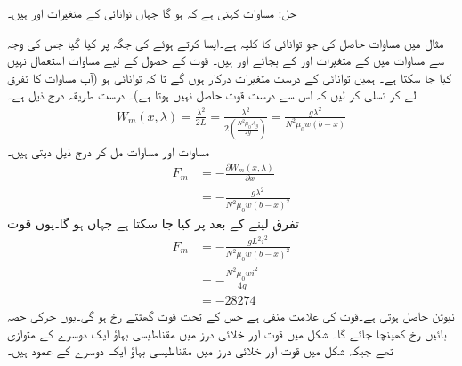 حل:\quad
مساوات   کہتی ہے کہ  ہو گا جہاں توانائی کے متغیرات   اور  ہیں۔

مثال  میں  مساوات  حاصل کی جو توانائی کا کلیہ ہے۔ایسا کرتے ہوئے    کی  جگہ   پر کیا گیا جس کی وجہ سے  مساوات  میں   کے متغیرات  اور  کے بجائے    اور  ہیں۔  قوت کے حصول کے لیے  مساوات  استعمال نہیں کیا جا سکتا ہے۔ ہمیں  توانائی کے درست متغیرات درکار ہوں گے تا کہ توانائی  ہو (آپ مساوات  کا تفرق لے کر تسلی کر لیں کہ اس سے درست قوت حاصل نہیں ہوتا ہے)۔ درست طریقہ درج ذیل ہے۔
\begin{align}\label{مساوات_تبادلہ_درست_متغیرات}
W_m(x,\lambda)=\frac{\lambda^2}{2 L}=\frac{\lambda^2}{2 \left(\frac{N^2 \mu_0 A_g}{2 g} \right)}=\frac{ g \lambda^2}{N^2 \mu_0 w (b-x)}
\end{align}
مساوات  اور مساوات  مل کر درج ذیل دیتی ہیں۔
\begin{align*}
F_m&=-\frac{\partial W_m(x,\lambda)}{\partial x}\\
&=-\frac{g \lambda^2}{N^2 \mu_0 w (b-x)^2}
\end{align*}
تفرق لینے کے بعد  پر کیا جا سکتا ہے جہاں   ہو گا۔یوں قوت
\begin{align*}
F_m&=-\frac{g L^2 i^2}{N^2 \mu_0 w (b-x)^2}\\
&=-\frac{N^2 \mu_0 w i^2}{4 g}\\
&=\num{-28274}
\end{align*}
نیوٹن حاصل ہوتی ہے۔قوت کی علامت منفی ہے جس کے تحت قوت   گھٹتے  رخ ہو گی۔یوں حرکی حصہ بائیں رخ کھینچا جائے گا۔ شکل  میں قوت اور خلائی درز میں مقناطیسی بہاؤ ایک دوسرے کے متوازی تھے جبکہ شکل  میں قوت اور خلائی درز میں مقناطیسی بہاؤ ایک دوسرے کے عمود  ہیں۔ 

